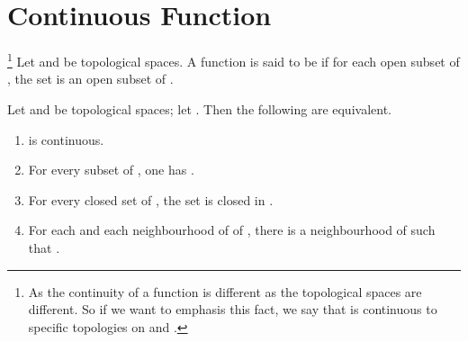 \section{Continuous Function}

\begin{definition}[continuous]\label{def:Continuous}\footnote{
      As the continuity of a function is different as the topological spaces are different. So if we want to emphasis this fact, we say that  is continuous \label{def:ContinuousRelativeTo} to specific topologies on  and .
}
      Let  and  be topological spaces. A function  is said to be  if for each open subset  of , the set  is an open subset of .
\end{definition}

\begin{theorem}
      Let  and  be topological spaces; let . Then the following are equivalent.
      \begin{enumerate}
            \item {} is continuous.
            \item For every subset  of , one has .
            \item For every closed set  of , the set  is closed in .
            \item For each  and each neighbourhood of  of , there is a neighbourhood  of  such that .
      \end{enumerate}
\end{theorem}

